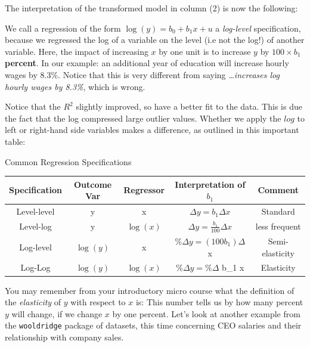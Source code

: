 \documentclass[]{book}
\newenvironment{note}{\begin{tcolorbox}[colback=blue!5!white,colframe=blue!75!black]}{\end{tcolorbox}}
\begin{document}
The interpretation of the transformed model in column (2) is now the following:

\begin{note}
We call a regression of the form \(\log(y) = b_0 + b_1 x + u\) a
\emph{log-level} specification, because we regressed the log of a
variable on the level (i.e not the log!) of another variable. Here, the
impact of increasing \(x\) by one unit is to increase \(y\) by
\(100 \times b_1\) \textbf{percent}. In our example: an additional year
of education will increase hourly wages by 8.3\%. Notice that this is
very different from saying \emph{\ldots{}increases log hourly wages by
8.3\%}, which is wrong.
\end{note}

Notice that the \(R^2\) slightly improved, so have a better fit to the data. This is due the fact that the log compressed large outlier values. Whether we apply the \(log\) to left or right-hand side variables makes a difference, as outlined in this important table:

\label{tab:loglog} Common Regression Specifications

\begin{longtable}[]{@{}ccccc@{}}
\toprule
Specification & Outcome Var & Regressor & Interpretation of \(b_1\) & Comment\tabularnewline
\midrule
\endhead
Level-level & y & x & \(\Delta y = b_1 \Delta x\) & Standard\tabularnewline
Level-log & y & \(\log(x)\) & \(\Delta y = \frac{b_1}{100} \Delta x\) & less frequent\tabularnewline
Log-level & \(\log(y)\) & x & \(\% \Delta y = (100 b_1) \Delta\) x & Semi-elasticity\tabularnewline
Log-Log & \(\log(y)\) & \(\log(x)\) & \(\% \Delta y = \% \Delta\) b\_1 x & Elasticity\tabularnewline
\bottomrule
\end{longtable}

You may remember from your introductory micro course what the definition of the \emph{elasticity} of \(y\) with respect to \(x\) is: This number tells us by how many percent \(y\) will change, if we change \(x\) by one percent. Let's look at another example from the \texttt{wooldridge} package of datasets, this time concerning CEO salaries and their relationship with company sales.
\end{document}
